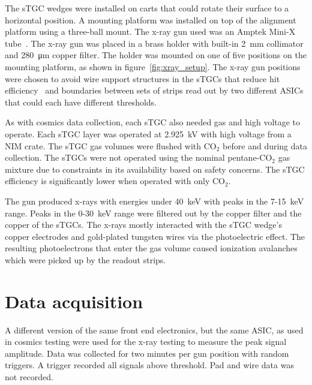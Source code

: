 The sTGC wedges were installed on carts that could rotate their surface to a horizontal position. A mounting platform was installed on top of the alignment platform using a three-ball mount. The x-ray gun used was an Amptek Mini-X tube~\cite{xray_gun}. The x-ray gun was placed in a brass holder with built-in \SI{2}{mm} collimator and \SI{280}{\micro\meter} copper filter. The holder was mounted on one of five positions on the mounting platform, as shown in figure~\ref{fig:xray_setup}. The x-ray gun positions were chosen to avoid wire support structures in the sTGCs that reduce hit efficiency~\cite{lefebvre_thesis} and boundaries between sets of strips read out by two different ASICs that could each have different thresholds. 

As with cosmics data collection, each sTGC also needed gas and high voltage to operate. Each sTGC layer was operated at \SI{2.925}{kV} with high voltage from a NIM crate. The sTGC gas volumes were flushed with CO$_2$ before and during data collection. The sTGCs were not operated using the nominal pentane-CO$_2$ gas mixture due to constraints in its availability based on safety concerns. The sTGC efficiency is significantly lower when operated with only CO$_2$.

The gun produced x-rays with energies under \SI{40}{\kilo\electronvolt} with peaks in the 7-\SI{15}{keV} range. Peaks in the 0-\SI{30}{keV} range were filtered out by the copper filter and the copper of the sTGCs. The x-rays mostly interacted with the sTGC wedge's copper electrodes and gold-plated tungsten wires via the photoelectric effect. The resulting photoelectrons that enter the gas volume caused ionization avalanches which were picked up by the readout strips.

\section{Data acquisition}

A different version of the same front end electronics, but the same ASIC, as used in cosmics testing were used for the x-ray testing to measure the peak signal amplitude. Data was collected for two minutes per gun position with random triggers. A trigger recorded all signals above threshold. Pad and wire data was not recorded.

